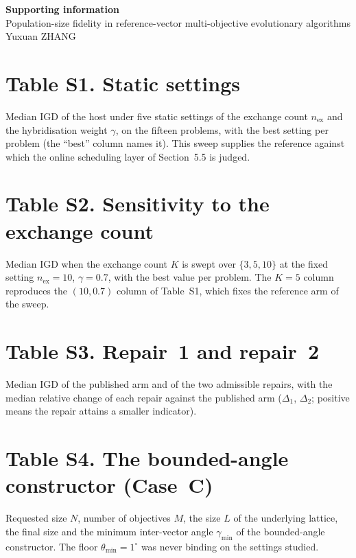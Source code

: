 \documentclass[11pt]{article}
\begin{document}
\begin{center}
{\Large\bfseries Supporting information}\\[4pt]
{\large Population-size fidelity in reference-vector multi-objective evolutionary algorithms}\\[2pt]
{\normalsize Yuxuan ZHANG}
\end{center}

\section{Table S1. Static settings}


Median IGD of the host under five static settings of the exchange count $n_{\mathrm{ex}}$ and the hybridisation weight $\gamma$, on the fifteen problems, with the best setting per problem (the ``best'' column names it). This sweep supplies the reference against which the online scheduling layer of Section~5.5 is judged.

\section{Table S2. Sensitivity to the exchange count}


Median IGD when the exchange count $K$ is swept over $\{3,5,10\}$ at the fixed setting $n_{\mathrm{ex}}=10$, $\gamma=0.7$, with the best value per problem. The $K=5$ column reproduces the $(10,0.7)$ column of Table~S1, which fixes the reference arm of the sweep.

\section{Table S3. Repair~1 and repair~2}


Median IGD of the published arm and of the two admissible repairs, with the median relative change of each repair against the published arm ($\Delta_1$, $\Delta_2$; positive means the repair attains a smaller indicator).

\section{Table S4. The bounded-angle constructor (Case~C)}


Requested size $N$, number of objectives $M$, the size $L$ of the underlying lattice, the final size and the minimum inter-vector angle $\gamma_{\min}$ of the bounded-angle constructor. The floor $\theta_{\min}=1^\circ$ was never binding on the settings studied.
\end{document}
